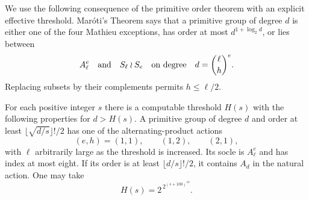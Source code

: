 We use the following consequence of the primitive order theorem with an
explicit effective threshold.  Mar\'oti's Theorem
\citep[Theorem~1.1]{Maroti2002} says that a primitive group of degree $d$
is either one of the four Mathieu exceptions, has order at most
$d^{1+\log_2d}$, or lies between
\[
 A_\ell^e\quad\hbox{and}\quad S_\ell\wr S_e
 \quad\hbox{on degree}\quad d=\binom{\ell}{h}^{e}.
\]
Replacing subsets by their complements permits $h\le\ell/2$.

\begin{lemma}\label{n:primitive-parts}
For each positive integer $s$ there is a computable threshold $H(s)$
with the following properties for $d>H(s)$.  A primitive group of degree
$d$ and order at least $\lfloor\sqrt{d/s}\rfloor!/2$ has one of the
alternating-product actions
\begin{equation}\label{n:three-actions}
 (e,h)=(1,1),\qquad(1,2),\qquad(2,1),
\end{equation}
with $\ell$ arbitrarily large as the threshold is increased.  Its socle
is $A_\ell^e$ and has index at most eight.  If its order is at least
$\lfloor d/s\rfloor!/2$, it contains $A_d$ in the natural action.
One may take
\begin{equation}\label{n:threshold}
 H(s)=2^{\,2^{(s+100)^{10}}}.
\end{equation}
\end{lemma}

